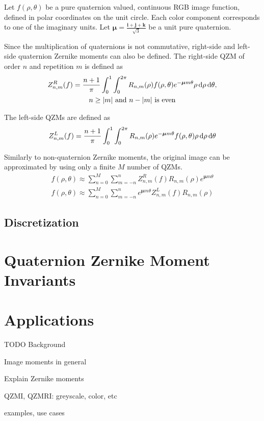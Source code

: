 Let $f(\rho,\theta)$ be a pure quaternion valued, continuous RGB image function, defined in polar coordinates on the unit circle. Each color component corresponds to one of the imaginary units. Let $\bm{\mu} = \frac{\mathbf{i} + \mathbf{j} + \mathbf{k}}{\sqrt{3}}$ be a unit pure quaternion.

Since the multiplication of quaternions is not commutative, right-side and left-side quaternion Zernike moments can also be defined. The right-side QZM of order $n$ and repetition $m$ is defined as
\begin{gather*}
  Z_{n,m}^R(f) = \frac{n + 1}{\pi}\int_0^1\int_0^{2\pi}R_{n,m}(\rho)f(\rho,\theta)e^{-\bm{\mu}m\theta}\rho\dif\rho\dif\theta, \\
  n \geq |m| \text{  and  } n - |m| \text{  is even}
\end{gather*}

The left-side QZMs are defined as 
\begin{gather*}
  Z_{n,m}^L(f) = \frac{n + 1}{\pi}\int_0^1\int_0^{2\pi}R_{n,m}(\rho)e^{-\bm{\mu}m\theta}f(\rho,\theta)\rho\dif\rho\dif\theta
\end{gather*}

Similarly to non-quaternion Zernike moments, the original image can be approximated by using only a finite $M$ number of QZMs.
\begin{gather*}
  f(\rho,\theta) \approx \sum_{n=0}^{M}\sum_{m=-n}^{n}Z_{n,m}^R(f)R_{n,m}(\rho)e^{\bm{\mu}m\theta} \\
  f(\rho,\theta) \approx \sum_{n=0}^{M}\sum_{m=-n}^{n}e^{\bm{\mu}m\theta}Z_{n,m}^L(f)R_{n,m}(\rho)
\end{gather*}

\subsection{Discretization}


\section{Quaternion Zernike Moment Invariants}

\section{Applications}




TODO Background

Image moments in general

Explain Zernike moments

QZMI, QZMRI:
greyscale, color, etc

examples, use cases
